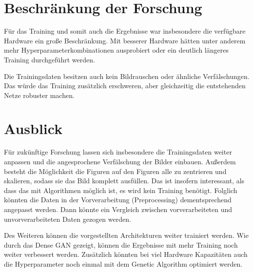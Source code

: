 \section{Beschränkung der Forschung}
Für das Training und somit auch die Ergebnisse war insbesondere die verfügbare Hardware ein große Beschränkung.
Mit besserer Hardware hätten unter anderem mehr Hyperparameterkombinationen ausprobiert oder ein deutlich längeres Training durchgeführt werden.
\newline

Die Trainingsdaten besitzen auch kein Bildrauschen oder ähnliche Verfälschungen.
Das würde das Training zusätzlich erschweren, aber gleichzeitig die entstehenden Netze robuster machen.

\section{Ausblick}
Für zukünftige Forschung lassen sich insbesondere die Trainingsdaten weiter anpassen und die angesprochene Verfälschung der Bilder einbauen.
Außerdem besteht die Möglichkeit die Figuren auf den Figuren alle zu zentrieren und skalieren, sodass sie das Bild komplett ausfüllen.
Das ist insofern interessant, als dass das mit Algorithmen möglich ist, es wird kein Training benötigt.
Folglich könnten die Daten in der Vorverarbeitung (Preprocessing) dementsprechend angepasst werden.
Dann könnte ein Vergleich zwischen vorverarbeiteten und unvorverarbeiteten Daten gezogen werden.
\newline

Des Weiteren können die vorgestellten Architekturen weiter trainiert werden.
Wie durch das Dense GAN gezeigt, können die Ergebnisse mit mehr Training noch weiter verbessert werden.
Zusätzlich könnten bei viel Hardware Kapazitäten auch die Hyperparameter noch einmal mit dem Genetic Algorithm optimiert werden.
